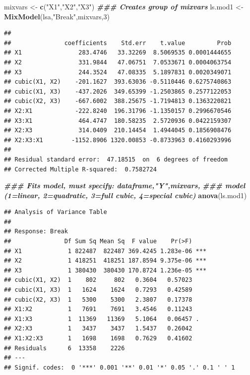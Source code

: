 \documentclass[
]{book}
\newenvironment{Shaded}{\begin{snugshade}}{\end{snugshade}}
\newcommand{\DecValTok}[1]{\textcolor[rgb]{0.00,0.00,0.81}{#1}}
\newcommand{\DocumentationTok}[1]{\textcolor[rgb]{0.56,0.35,0.01}{\textbf{\textit{#1}}}}
\newcommand{\FunctionTok}[1]{\textcolor[rgb]{0.13,0.29,0.53}{\textbf{#1}}}
\newcommand{\NormalTok}[1]{#1}
\newcommand{\OtherTok}[1]{\textcolor[rgb]{0.56,0.35,0.01}{#1}}
\newcommand{\StringTok}[1]{\textcolor[rgb]{0.31,0.60,0.02}{#1}}
\begin{document}
\begin{Shaded}
\begin{Highlighting}[]
\NormalTok{mixvars }\OtherTok{\textless{}{-}} \FunctionTok{c}\NormalTok{(}\StringTok{"X1"}\NormalTok{,}\StringTok{"X2"}\NormalTok{,}\StringTok{"X3"}\NormalTok{) }\DocumentationTok{\#\#\# Creates group of mixvars}
\NormalTok{ls.mod1 }\OtherTok{\textless{}{-}} \FunctionTok{MixModel}\NormalTok{(lsa,}\StringTok{"Break"}\NormalTok{,mixvars,}\DecValTok{3}\NormalTok{)}
\end{Highlighting}
\end{Shaded}

\begin{verbatim}
##      
##               coefficients    Std.err    t.value         Prob
## X1                283.4746   33.32269  8.5069535 0.0001444655
## X2                331.9844   47.06751  7.0533671 0.0004063754
## X3                244.3524   47.08335  5.1897831 0.0020349071
## cubic(X1, X2)    -201.1627  393.63036 -0.5110446 0.6275740863
## cubic(X1, X3)    -437.2026  349.65399 -1.2503865 0.2577122053
## cubic(X2, X3)    -667.6002  388.25675 -1.7194813 0.1363220821
## X2:X1            -222.8240  196.31796 -1.1350157 0.2996670546
## X3:X1             464.4747  180.58235  2.5720936 0.0422159307
## X2:X3             314.0409  210.14454  1.4944045 0.1856908476
## X2:X3:X1        -1152.8906 1320.00853 -0.8733963 0.4160293996
##      
## Residual standard error:  47.18515  on  6 degrees of freedom 
## Corrected Multiple R-squared:  0.7582724
\end{verbatim}

\begin{Shaded}
\begin{Highlighting}[]
\DocumentationTok{\#\#\# Fits model, must specify: dataframe,"Y",mixvars,}
\DocumentationTok{\#\#\# model (1=linear, 2=quadratic, 3=full cubic, 4=special cubic)}
\FunctionTok{anova}\NormalTok{(ls.mod1)}
\end{Highlighting}
\end{Shaded}

\begin{verbatim}
## Analysis of Variance Table
## 
## Response: Break
##               Df Sum Sq Mean Sq  F value    Pr(>F)    
## X1             1 822487  822487 369.4245 1.283e-06 ***
## X2             1 418251  418251 187.8594 9.375e-06 ***
## X3             1 380430  380430 170.8724 1.236e-05 ***
## cubic(X1, X2)  1    802     802   0.3604   0.57023    
## cubic(X1, X3)  1   1624    1624   0.7293   0.42589    
## cubic(X2, X3)  1   5300    5300   2.3807   0.17378    
## X1:X2          1   7691    7691   3.4546   0.11243    
## X1:X3          1  11369   11369   5.1064   0.06457 .  
## X2:X3          1   3437    3437   1.5437   0.26042    
## X1:X2:X3       1   1698    1698   0.7629   0.41602    
## Residuals      6  13358    2226                       
## ---
## Signif. codes:  0 '***' 0.001 '**' 0.01 '*' 0.05 '.' 0.1 ' ' 1
\end{verbatim}
\end{document}
